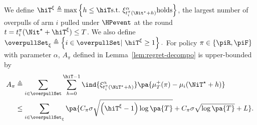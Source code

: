 \begin{lemma}
\label{lem:rested-A}
We define $\hiT^\xi \triangleq \max\left\{ h \leq \hiT \text{s.t.} \ \xi^\alpha_{t_i^{\pi}(\Nit^\star + h)} \text{holds} \right\}$, the largest number of overpulls of arm $i$ pulled under $\HPevent$ at the round $t = t_i^{\pi}(\Nit^\star + \hiT^\xi) \leq T$. We also define $\overpullSet_\xi \triangleq \left\{ i \in \overpullSet | \  \hiT^\xi \geq 1 \right\}.$ For policy $\pi \in \left\{ \piR, \piF\right\}$ with parameter $\alpha$, $A_{\pi}$ defined in Lemma~\ref{lem:regret-decompo} is upper-bounded by
\begin{align*}
A_{\pi} &\triangleq  \sum_{i\in \overpullSet}   \sum_{h=0}^{\hiT-1}  \ind{ \xi^\alpha_{t_i^{\pi}(\NiT^\star + h) }} \pa{\mu^+_T(\pi) - \mu_i(\NiT^{\star} + h)} \\
& \leq \sum_{i\in \overpullSet_\xi} \pa{C_\pi \sigma \sqrt{\left(\hiT^\xi -1\right)\log\pa{T}} +C_\pi \sigma\sqrt{\log{\pa{T}}}+  L}.
\end{align*}
\end{lemma}
